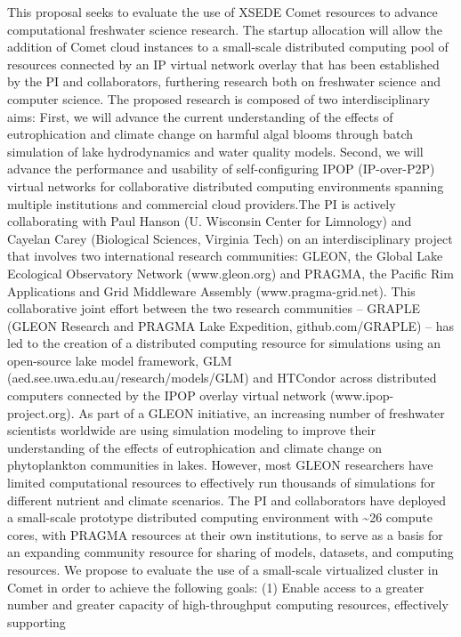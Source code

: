 This proposal seeks to evaluate the use of XSEDE Comet resources to
advance computational freshwater science research. The startup
allocation will allow the addition of Comet cloud instances to a
small-scale distributed computing pool of resources connected by an IP
virtual network overlay that has been established by the PI and
collaborators, furthering research both on freshwater science and
computer science. The proposed research is composed of two
interdisciplinary aims: First, we will advance the current understanding
of the effects of eutrophication and climate change on harmful algal
blooms through batch simulation of lake hydrodynamics and water quality
models. Second, we will advance the performance and usability of
self-configuring IPOP (IP-over-P2P) virtual networks for collaborative
distributed computing environments spanning multiple institutions and
commercial cloud providers.The PI is actively collaborating with Paul
Hanson (U. Wisconsin Center for Limnology) and Cayelan Carey (Biological
Sciences, Virginia Tech) on an interdisciplinary project that involves
two international research communities: GLEON, the Global Lake
Ecological Observatory Network (www.gleon.org) and PRAGMA, the Pacific
Rim Applications and Grid Middleware Assembly (www.pragma-grid.net).
This collaborative joint effort between the two research communities --
GRAPLE (GLEON Research and PRAGMA Lake Expedition, github.com/GRAPLE) --
has led to the creation of a distributed computing resource for
simulations using an open-source lake model framework, GLM
(aed.see.uwa.edu.au/research/models/GLM) and HTCondor across distributed
computers connected by the IPOP overlay virtual network
(www.ipop-project.org). As part of a GLEON initiative, an increasing
number of freshwater scientists worldwide are using simulation modeling
to improve their understanding of the effects of eutrophication and
climate change on phytoplankton communities in lakes. However, most
GLEON researchers have limited computational resources to effectively
run thousands of simulations for different nutrient and climate
scenarios. The PI and collaborators have deployed a small-scale
prototype distributed computing environment with \textasciitilde{}26
compute cores, with PRAGMA resources at their own institutions, to serve
as a basis for an expanding community resource for sharing of models,
datasets, and computing resources. We propose to evaluate the use of a
small-scale virtualized cluster in Comet in order to achieve the
following goals: (1) Enable access to a greater number and greater
capacity of high-throughput computing resources, effectively supporting
